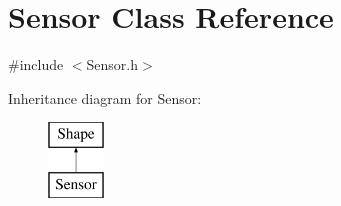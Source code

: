 \hypertarget{classSensor}{\section{Sensor Class Reference}
\label{classSensor}
}


{\ttfamily \#include $<$Sensor.\-h$>$}

Inheritance diagram for Sensor\-:\begin{figure}[H]
\begin{center}
\leavevmode
\includegraphics[height=2.000000cm]{classSensor}
\end{center}
\end{figure}
